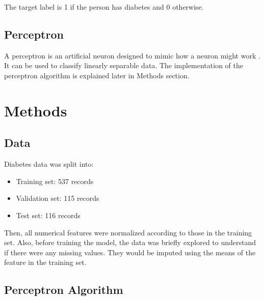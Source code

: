 \documentclass[10pt,twocolumn,letterpaper]{article}
\begin{document}
The target label is 1 if the person has diabetes and 0 otherwise.

\subsection{Perceptron}

A perceptron is an artificial neuron designed to mimic how a neuron might work \citep{rosenblatt-1958}. It can
be used to classify linearly separable data. The implementation of the perceptron algorithm is explained later
in Methods section.


\section{Methods}


\subsection{Data}

Diabetes data was split into:

\begin{itemize}
  \item Training set: 537 records
  \item Validation set: 115 records
  \item Test set: 116 records
\end{itemize}

Then, all numerical features were normalized according to those in the training set. Also, before training the
model, the data was briefly explored to understand if there were any missing values. They would be imputed using
the means of the feature in the training set.

\subsection{Perceptron Algorithm}
\end{document}
